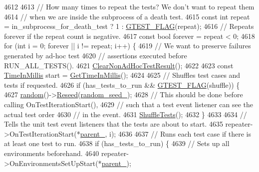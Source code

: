 \begin{DoxyCode}
{4612 
4613   \textcolor{comment}{// How many times to repeat the tests?  We don't want to repeat them}
4614   \textcolor{comment}{// when we are inside the subprocess of a death test.}
4615   \textcolor{keyword}{const} \textcolor{keywordtype}{int} repeat = in\_subprocess\_for\_death\_test ? 1 : \hyperlink{gtest-port_8h_a828f4e34a1c4b510da50ec1563e3562a}{GTEST\_FLAG}(repeat);
4616   \textcolor{comment}{// Repeats forever if the repeat count is negative.}
4617   \textcolor{keyword}{const} \textcolor{keywordtype}{bool} forever = repeat < 0;
4618   \textcolor{keywordflow}{for} (\textcolor{keywordtype}{int} i = 0; forever || i != repeat; i++) \{
4619     \textcolor{comment}{// We want to preserve failures generated by ad-hoc test}
4620     \textcolor{comment}{// assertions executed before RUN\_ALL\_TESTS().}
4621     \hyperlink{classtesting_1_1internal_1_1UnitTestImpl_a96c2a5b23541ef01020c402644563ba1}{ClearNonAdHocTestResult}();
4622 
4623     \textcolor{keyword}{const} \hyperlink{namespacetesting_1_1internal_a66a845df404b38fe85c5e14a069f255a}{TimeInMillis} start = \hyperlink{namespacetesting_1_1internal_ae66b46943a429e6efb1db456d4cae90c}{GetTimeInMillis}();
4624 
4625     \textcolor{comment}{// Shuffles test cases and tests if requested.}
4626     \textcolor{keywordflow}{if} (has\_tests\_to\_run && \hyperlink{gtest-port_8h_a828f4e34a1c4b510da50ec1563e3562a}{GTEST\_FLAG}(shuffle)) \{
4627       \hyperlink{classtesting_1_1internal_1_1UnitTestImpl_ab3b45b5eb4d583219a3602011ea44347}{random}()->\hyperlink{classtesting_1_1internal_1_1Random_adf2f24199318a46f885c78f50d89a69e}{Reseed}(\hyperlink{classtesting_1_1internal_1_1UnitTestImpl_a0afcc95308ebfacb8d0f53790e77e1ab}{random\_seed\_});
4628       \textcolor{comment}{// This should be done before calling OnTestIterationStart(),}
4629       \textcolor{comment}{// such that a test event listener can see the actual test order}
4630       \textcolor{comment}{// in the event.}
4631       \hyperlink{classtesting_1_1internal_1_1UnitTestImpl_aaaa38e6a4372e6bb9bbe3143a3a32b65}{ShuffleTests}();
4632     \}
4633 
4634     \textcolor{comment}{// Tells the unit test event listeners that the tests are about to start.}
4635     repeater->OnTestIterationStart(*\hyperlink{classtesting_1_1internal_1_1UnitTestImpl_adabbbc8985202ce655d50746bd383eae}{parent\_}, i);
4636 
4637     \textcolor{comment}{// Runs each test case if there is at least one test to run.}
4638     \textcolor{keywordflow}{if} (has\_tests\_to\_run) \{
4639       \textcolor{comment}{// Sets up all environments beforehand.}
4640       repeater->OnEnvironmentsSetUpStart(*\hyperlink{classtesting_1_1internal_1_1UnitTestImpl_adabbbc8985202ce655d50746bd383eae}{parent\_});
}
\end{DoxyCode}
